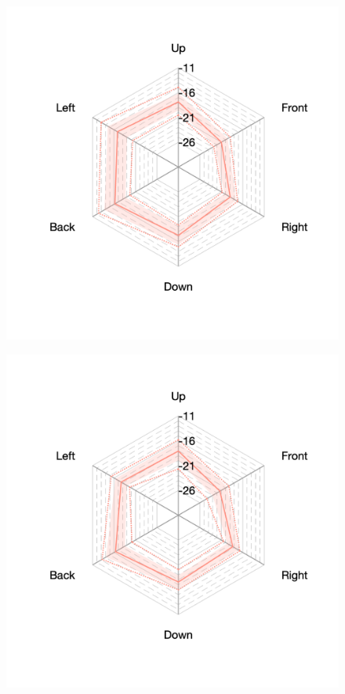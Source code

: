 \documentclass[11pt,a4j]{jreport}
\begin{document}
\begin{figure}[H]
      \begin{minipage}[b]{.33\textwidth}
        \hspace{1 \linewidth}
      \end{minipage}%
      \begin{minipage}[b]{.33\textwidth}
        \centering
        \includegraphics[width=1\linewidth]{images/realHallDirSt/early_S10_allhall.png}
        \label{fig:S10early}
      \end{minipage}%
      \begin{minipage}[b]{.33\textwidth}
        \centering
        \includegraphics[width=1\linewidth]{images/realHallDirSt/early_S09_allhall.png}
        \label{fig:S09early}
      \end{minipage}


\end{figure}
\end{document}
